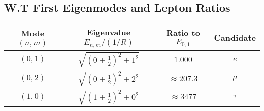 \subsection*{W.T First Eigenmodes and Lepton Ratios}
\begin{center}
\begin{tabular}{c c c c}
\toprule
Mode $(n,m)$ & Eigenvalue $E_{n,m}/(1/R)$ & Ratio to $E_{0,1}$ & Candidate \\
\midrule
$(0,1)$ & $\sqrt{(0+\tfrac{1}{2})^2+1^2}$ & $1.000$ & $e$ \\
$(0,2)$ & $\sqrt{(0+\tfrac{1}{2})^2+2^2}$ & $\approx 207.3$ & $\mu$ \\
$(1,0)$ & $\sqrt{(1+\tfrac{1}{2})^2+0^2}$ & $\approx 3477$ & $\tau$ \\
\bottomrule
\end{tabular}
\end{center}

